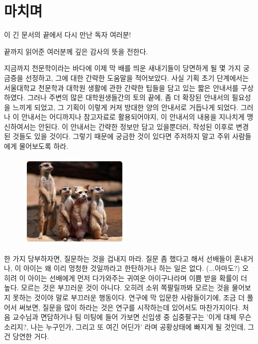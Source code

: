 \chapter{마치며}

이 긴 문서의 끝에서 다시 만난 독자 여러분!

끝까지 읽어준 여러분께 깊은 감사의 뜻을 전한다.
\vspace{\baselineskip}

지금까지 천문학이라는 바다에 이제 막 배를 띄운 새내기들이 당면하게 될 몇 가지
궁금증을 선정하고, 그에 대한 간략한 도움말을 적어보았다. 사실 기획 초기
단계에서는 서울대학교 천문학과 대학원 생활에 관한 간략한 팁들을 담고 있는 짧은
안내서를 구상하였다. 그러나 주변의 많은 대학원생들간의 토의 끝에, 좀 더 확장된
안내서의 필요성을 느끼게 되었고, 그 기획이 이렇게 커져 방대한 양의 안내서로
거듭나게 되었다. 그러나 이 안내서는 어디까지나 참고자료로 활용되어야지, 이
안내서의 내용을 지나치게 맹신하여서는 안된다. 이 안내서는 간략한 정보만 담고
있을뿐더러, 작성된 이후로 변경된 것들도 있을 것이다. 그렇기 때문에 궁금한 것이
있다면 주저하지 말고 주위 사람들에게 물어보도록 하라.  \vspace{\baselineskip}

\begin{figure}
  \begin{center}
    \includegraphics[width=0.48\textwidth]{./Figures/meerkat.jpg}
  \end{center}
  \vspace{-20pt}
  \vspace{-10pt}
\end{figure}
한 가지 당부하자면, 질문하는 것을 겁내지 마라. 질문 좀 했다고 해서 선배들이
혼내거나, 이 아이는 왜 이리 멍청한 것일까라고 한탄하거나 하는 일은
없다. (...아마도?) 오히려 이 아이는 선배에게 먼저 다가와주는 귀여운 아이구나라며
이쁨 받을 확률이 더 높다. 모르는 것은 부끄러운 것이 아니다. 오히려 소위
쪽팔릴까봐 모르는 것을 물어보지 못하는 것이야 말로 부끄러운 행동이다.  연구에 막
입문한 사람들이기에, 조금 더 풀어서 써보면, 질문을 많이 하라는 것은 연구를
시작하는데 있어서도 마찬가지이다. 처음 교수님과 면담하거나 팀 미팅에 들어 가보면
신입생 중 십중팔구는 '이게 대체 무슨 소리지?, 나는 누구인가, 그리고 또 여긴
어딘가' 라며 공황상태에 빠지게 될 것인데, 그건 당연한 거다.
\vspace{\baselineskip}

